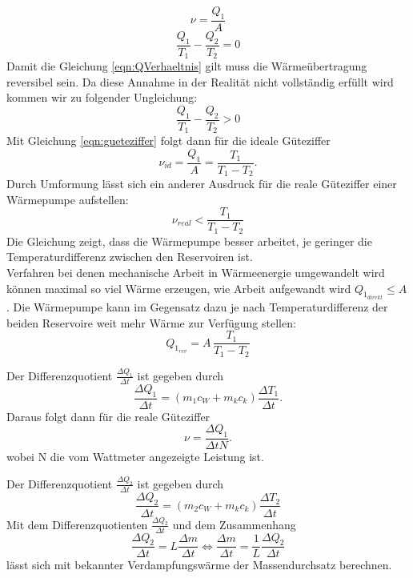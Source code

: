 \begin{equation}\label{eqn:gueteziffer}
    ν = \frac{Q_1}{A}
\end{equation}
\begin{equation}\label{eqn:QVerhaeltnis}
    \frac{Q_1}{T_1} - \frac{Q_2}{T_2} = 0
\end{equation}
Damit die Gleichung \eqref{eqn:QVerhaeltnis} gilt muss die Wärmeübertragung reversibel sein. 
Da diese Annahme in der Realität nicht vollständig erfüllt wird kommen wir zu folgender Ungleichung:
\begin{equation}
    \frac{Q_1}{T_1} - \frac{Q_2}{T_2} > 0
\end{equation}
Mit Gleichung \eqref{eqn:gueteziffer} folgt dann für die ideale Güteziffer 
\begin{equation}\label{eqn:guetezfferIdeal}
    ν_{id} = \frac{Q_1}{A} = \frac{T_1}{T_1 - T_2}.
\end{equation}
Durch Umformung lässt sich ein anderer Ausdruck für die reale Güteziffer einer Wärmepumpe aufstellen:
\begin{equation}\label{eqn:guetezifferReal}
    ν_{real} < \frac{T_1}{T_1 - T_2}
\end{equation}
Die Gleichung zeigt, dass die Wärmepumpe besser arbeitet, je geringer die Temperaturdifferenz zwischen den 
Reservoiren ist.\\
Verfahren bei denen mechanische Arbeit in Wärmeenergie umgewandelt wird können maximal so viel Wärme erzeugen,
wie Arbeit aufgewandt wird $Q_{1_{direkt}} \leq A$. 
Die Wärmepumpe kann im Gegensatz dazu je nach Temperaturdifferenz der beiden Reservoire weit mehr Wärme
zur Verfügung stellen:
\begin{equation}
    Q_{1_{rev}} = A\, \frac{T_1}{T_1 - T_2}
\end{equation}

Der Differenzquotient $\frac{ΔQ_1}{Δt}$ ist gegeben durch 
\begin{equation}
    \label{delQ1}
    \frac{ΔQ_1}{Δt} = \left(m_1c_W + m_kc_k\right)\frac{ΔT_1}{Δt}.
\end{equation}
Daraus folgt dann für die reale Güteziffer
\begin{equation}
    \label{vreal}
    ν = \frac{ΔQ_1}{ΔtN}.
\end{equation}
wobei N die vom Wattmeter angezeigte Leistung ist.

Der Differenzquotient $\frac{ΔQ_2}{Δt}$ ist gegeben durch
\begin{equation}\label{eqn:diffQ2}
    \frac{ΔQ_2}{Δt} = \left(m_2c_W + m_kc_k\right)\frac{ΔT_2}{Δt}
\end{equation}
Mit dem Differenzquotienten $\frac{ΔQ_2}{Δt}$ und dem Zusammenhang
\begin{equation}\label{eqn:massendurchsatz}
    \frac{ΔQ_2}{Δt} = L\frac{Δm}{Δt} \Leftrightarrow \frac{Δm}{Δt} = \frac{1}{L}\frac{ΔQ_2}{Δt}
\end{equation}
lässt sich mit bekannter Verdampfungswärme der Massendurchsatz berechnen.

